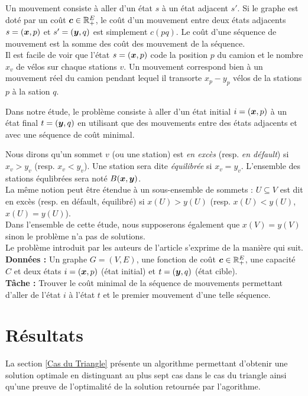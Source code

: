 \documentclass[twoside,11pt,openany,a4paper]{rapport}
\begin{document}
Un mouvement consiste à aller d'un état $s$ à un état adjacent $s'$. Si le graphe est doté par un coût $\boldsymbol{c} \in \mathbb{R}^E_+$, le coût d'un mouvement entre deux états adjacents $s=(\boldsymbol{x},p)$ et $s'=(\boldsymbol{y},q)$ est simplement $c(pq)$. Le coût d'une séquence de mouvement est la somme des coût des mouvement de la séquence.
\\

Il est facile de voir que l'état $s=(\boldsymbol{x},p)$ code la position $p$ du camion et le nombre $x_v$ de vélos sur chaque stations $v$. Un mouvement correspond bien à un mouvement réel du camion pendant lequel il transorte $x_p-y_p$ vélos de la stations $p$ à la sation $q$.

Dans notre étude, le problème consiste à aller d'un état initial $i=(\boldsymbol{x},p)$ à un état final $t=(\boldsymbol{y},q)$ en utilisant que des mouvements entre des états adjacents et avec une séquence de coût minimal.

Nous dirons qu'un sommet $v$ (ou une station) est \emph{en excès} (resp. \emph{en défault}) si $x_v > y_v$ (resp. $x_v < y_v$). Une station sera dite \emph{équilibrée} si $x_v=y_v$. L'ensemble des stations équlibrées sera noté $B(\boldsymbol{x},\boldsymbol{y})$.
\\
La même notion peut être étendue à un sous-ensemble de sommets : $U \subseteq V$ est dit en excès (resp. en défault, équilibré) si $x(U) > y(U)$ (resp. $x(U) < y(U)$, $x(U) = y(U)$).
\\

Dans l'ensemble de cette étude, nous supposerons également que $x(V) = y(V)$ sinon le problème n'a pas de solutions.
\\

Le problème introduit par les auteurs de l'article \cite{Benchimol2011} s'exprime de la manière qui suit.
\\
\textbf{Données :} Un graphe $G=(V,E)$, une fonction de coût $\boldsymbol{c} \in \mathbb{R}^E_+$, une capacité $C$ et deux états $i=(\boldsymbol{x},p)$ (état initial) et $t=(\boldsymbol{y},q)$ (état cible).
\\
\textbf{Tâche :} Trouver le coût minimal de la séquence de mouvements permettant d'aller de l'état $i$ à l'état $t$ et le premier mouvement d'une telle séquence.

\section{Résultats}

La section \ref{Cas du Triangle} présente un algorithme permettant d'obtenir une solution optimale en distinguant au plus sept cas dans le cas du triangle ainsi qu'une preuve de l'optimalité de la solution retournée par l'agorithme.
\end{document}
